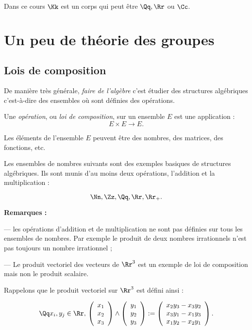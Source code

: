 \documentclass[class=report,crop=false]{standalone}
\begin{document}

\tableofcontents

Dans ce cours $\Kk$ est un corps qui peut être $\Qq,\Rr$ ou $\Cc$.

\chapter{Un peu de théorie des groupes}

\section{Lois de composition}

De manière très générale, {\it faire de l'algèbre} c'est étudier des structures algébriques c'est-à-dire des ensembles où sont définies des opérations.

Une {\it opération}, ou {\it loi de composition}, sur un ensemble $E$  est une application :
\[E \times E \to E .\]

Les éléments de l'ensemble $E$ peuvent être des nombres, des matrices, des fonctions, etc.

Les ensembles de nombres suivants sont des exemples basiques de structures algébriques. Ils sont munis d'au moins deux opérations, l'addition et la multiplication :

\[\Nn, \Zz, \Qq, \Rr, \Rr_+ .\]

{\bf Remarques :} 

--- les opérations d'addition et de multiplication ne sont pas définies sur tous les ensembles de nombres. Par exemple le produit de deux nombres irrationnels n'est pas toujours un nombre irrationnel ;

--- Le produit vectoriel des vecteurs de $\Rr^3$ est un exemple de loi de composition mais non le produit scalaire. 

Rappelons que le produit vectoriel sur $\Rr^3$ est défini ainsi :

\[\Qq x_i,y_j \in \Rr,\, \left(\begin{array}{c}
x_1\\
x_2\\
x_3
\end{array}\right) \wedge \left(\begin{array}{c}
y_1\\
y_2\\
y_3
\end{array}\right) :=\left(\begin{array}{c}
x_2y_3-x_3y_2\\
x_3y_1-x_1y_3\\
x_1y_2-x_2y_1
\end{array}\right)   .\]
\end{document}
